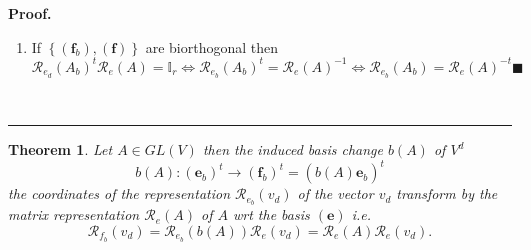 \documentclass[aps,preprint]{revtex4}
\newtheorem{theorem}{Theorem}
\newenvironment{proof}[1][Proof]{\noindent\textbf{#1.} }{\ \rule{0.5em}{0.5em}}
\begin{document}
\begin{proof}
\begin{enumerate}
\item If $\left\{ \left( \boldsymbol{f}_{b}\right) ,\left( \boldsymbol{f}%
\right) \right\} $ are biorthogonal then 
\begin{equation}
\mathcal{R}_{e_{d}}\left( A_{b}\right) ^{t}\mathcal{R}_{e}\left( A\right) =%
\mathbb{I}_{r}\Leftrightarrow \mathcal{R}_{e_{b}}\left( A_{b}\right) ^{t}=%
\mathcal{R}_{e}\left( A\right) ^{-1}\Leftrightarrow \mathcal{R}%
_{e_{b}}\left( A_{b}\right) =\mathcal{R}_{e}\left( A\right) ^{-t}\blacksquare
\end{equation}
\end{enumerate}
\end{proof}

\begin{theorem}
\label{Covariant Theorem} Let $A\in GL\left( V\right) $ then the induced
basis change $b\left( A\right) $ of $V^{d}$ 
\begin{equation}
b\left( A\right) :\left( \boldsymbol{e}_{b}\right) ^{t}\rightarrow \left( 
\boldsymbol{f}_{b}\right) ^{t}=\left( \overset{}{b\left( A\right) 
\boldsymbol{e}_{b}}\right) ^{t}
\end{equation}%
the coordinates of the representation $\mathcal{R}_{e_{b}}\left(
v_{d}\right) $ of the vector $v_{d}$ transform by the matrix representation $%
\mathcal{R}_{e}\left( A\right) $ of $A$ wrt the basis $\left( \boldsymbol{e}%
\right) $ i.e. 
\begin{equation}
\mathcal{R}_{f_{b}}\left( v_{d}\right) =\mathcal{R}_{e_{b}}\left( b\left(
A\right) \right) \mathcal{R}_{e}\left( v_{d}\right) =\mathcal{R}_{e}\left(
A\right) \mathcal{R}_{e}\left( v_{d}\right) .
\end{equation}


\end{theorem}
\end{document}
